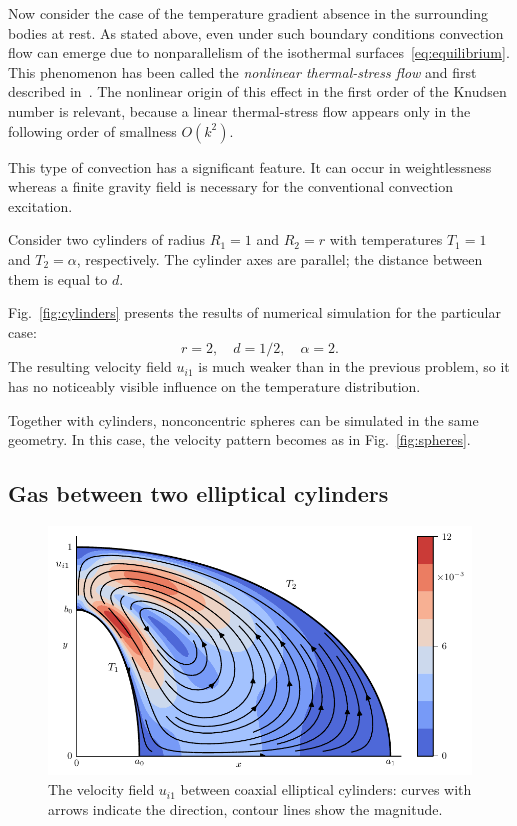 \documentclass[smallextended, referee]{svjour3} %
\begin{document}
Now consider the case of the temperature gradient absence in the surrounding bodies at rest.
As stated above, even under such boundary conditions convection flow can emerge
due to nonparallelism of the isothermal surfaces~\eqref{eq:equilibrium}.
This phenomenon has been called the \textit{nonlinear thermal-stress flow} and first described in~\cite{Kogan1971}.
The nonlinear origin of this effect in the first order of the Knudsen number is relevant,
because a linear thermal-stress flow appears only in the following order of smallness \(O(k^2)\).

This type of convection has a significant feature. It can occur in weightlessness
whereas a finite gravity field is necessary for the conventional convection excitation.

Consider two cylinders of radius \(R_1 = 1\) and \(R_2 = r\)
with temperatures \(T_1 = 1\) and \(T_2 = \alpha\), respectively.
The cylinder axes are parallel; the distance between them is equal to \(d\).

Fig.~\ref{fig:cylinders} presents the results of numerical simulation for the particular case:
\[ r = 2, \quad d = 1/2, \quad \alpha = 2. \]
The resulting velocity field \(u_{i1}\) is much weaker than in the previous problem,
so it has no noticeably visible influence on the temperature distribution.

Together with cylinders, nonconcentric spheres can be simulated in the same geometry.
In this case, the velocity pattern becomes as in Fig.~\ref{fig:spheres}.

\subsection{Gas between two elliptical cylinders}

\begin{figure}
	\centering
	\includegraphics{Fig9}
	\caption{The velocity field \(u_{i1}\) between coaxial elliptical cylinders:
		curves with arrows indicate the direction, contour lines show the magnitude.}
	\label{fig:elliptic}
\end{figure}
\end{document}
